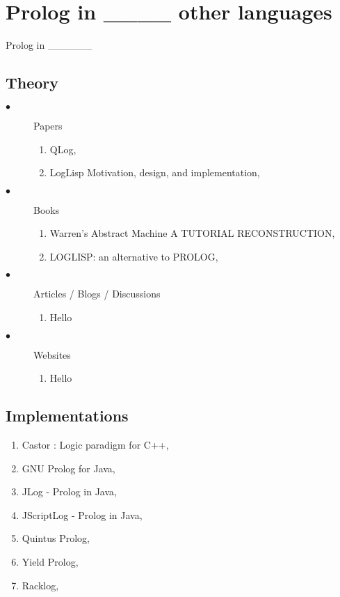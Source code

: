\documentclass[thesis-solanki.tex]{subfiles}
\begin{document}
\chapter{Prolog in \_\_\_\_ other  languages}\label{chap:prologin}

Prolog in \_\_\_\_\_\_
\section{Theory}
\begin{description}

\item[$\bullet$] Papers
\begin{enumerate}
\item QLog, \cite{komorowski1982qlog}
\item LogLisp Motivation, design, and implementation, \cite{robinson1982loglisp} 
\end{enumerate}

\item[$\bullet$] Books
\begin{enumerate}
\item Warren's Abstract Machine A TUTORIAL RECONSTRUCTION, \cite{ait1999warren}
\item LOGLISP: an alternative to PROLOG, \cite{robinson1980loglisp}
\end{enumerate}

\item[$\bullet$] Articles / Blogs / Discussions
\begin{enumerate}
\item Hello
\end{enumerate}


\item[$\bullet$] Websites
\begin{enumerate}
\item Hello
\end{enumerate}

\end{description}

\section{Implementations}
\begin{enumerate}
\item Castor : Logic paradigm for C++, \cite{castorc++}
\item GNU Prolog for Java, \cite{gnuprolog}
\item JLog - Prolog in Java, \cite{jlog}
\item JScriptLog - Prolog in Java, \cite{jscriptlog}
\item  Quintus Prolog, \cite{quintusprolog}
\item Yield Prolog, \cite{yieldprolog}
\item Racklog, \cite{racklog}
\end{enumerate}
\end{document}
